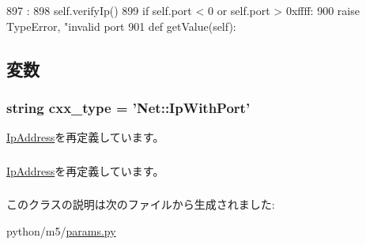 \begin{DoxyCode}
897                     :
898         self.verifyIp()
899         if self.port < 0 or self.port > 0xffff:
900             raise TypeError, "invalid port %
901 
    def getValue(self):
\end{DoxyCode}


\subsection{変数}
\hypertarget{classm5_1_1params_1_1IpWithPort_a2f1553ebb79374a68b36fdd6d8d82fc3}{
\subsubsection[{cxx\_\-type}]{\setlength{\rightskip}{0pt plus 5cm}string {\bf cxx\_\-type} = '{\bf Net::IpWithPort}'}}
\label{classm5_1_1params_1_1IpWithPort_a2f1553ebb79374a68b36fdd6d8d82fc3}


\hyperlink{classm5_1_1params_1_1IpAddress_a2f1553ebb79374a68b36fdd6d8d82fc3}{IpAddress}を再定義しています。\hypertarget{classm5_1_1params_1_1IpWithPort_afd65cf072a93c93ad52b9f25b341e10b}{
\subsubsection[{ip}]{}}
\label{classm5_1_1params_1_1IpWithPort_afd65cf072a93c93ad52b9f25b341e10b}


\hyperlink{classm5_1_1params_1_1IpAddress_afd65cf072a93c93ad52b9f25b341e10b}{IpAddress}を再定義しています。\hypertarget{classm5_1_1params_1_1IpWithPort_af8fb0f45ee0195c7422a49e6a8d72369}{
\subsubsection[{port}]{}}
\label{classm5_1_1params_1_1IpWithPort_af8fb0f45ee0195c7422a49e6a8d72369}


このクラスの説明は次のファイルから生成されました:\begin{DoxyCompactItemize}
\item 
python/m5/\hyperlink{params_8py}{params.py}\end{DoxyCompactItemize}
